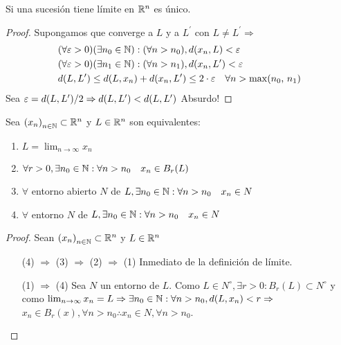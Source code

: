 \begin{lemma}
  Si una sucesión tiene límite en \(\mathbb{R}^n\) es único.
  \begin{proof}
    Supongamos que converge a \(L\) y a \(L^{\prime} \) con \(L \neq L^{\prime} \Rightarrow \) \begin{align*}
       & (\forall \varepsilon > 0)(\exists n_0 \in \mathbb{N}) : (\forall n > n_0), d(x_n, L) < \varepsilon                                      \\
       & (\forall \varepsilon > 0)(\exists n_1 \in \mathbb{N}) : (\forall n > n_1), d(x_n, L^{\prime}) < \varepsilon                             \\
       & d(L, L^{\prime}) \leq d(L, x_n) + d(x_n, L^{\prime}) \leq 2 \cdot \varepsilon \quad \forall n > \max(n_0\text{, } n_1)
    \end{align*}
    Sea \(\varepsilon = d(L, L^{\prime})/2 \Rightarrow d(L, L^{\prime}) < d(L, L^{\prime})\) Absurdo!
  \end{proof}
\end{lemma}

\begin{prop}
  Sea \({(x_n)}_{n \in \mathbb{N}} \subset \mathbb{R}^n\) y \(L \in \mathbb{R}^n\) son equivalentes:

  \begin{enumerate}
    \item \(L = \lim_{n \to \infty} x_n\)
    \item \(\forall r > 0, \exists n_0 \in \mathbb{N} : \forall n > n_0 \quad x_n \in B_r(L)\)
    \item \(\forall \) entorno abierto \(N\) de \(L, \exists n_0 \in \mathbb{N} : \forall n > n_0 \quad x_n \in N\)
    \item \(\forall \) entorno \(N\) de \(L, \exists n_0 \in \mathbb{N} : \forall n > n_0 \quad x_n \in N\)
  \end{enumerate}
  \begin{proof}
    Sean \({(x_n)}_{n \in \mathbb{N}} \subset \mathbb{R}^n\) y \(L \in \mathbb{R}^n\) \begin{enumerate}
      \item[(4) \(\Rightarrow \) (3)] \(\Rightarrow \) (2) \(\Rightarrow \) (1) Inmediato de la definición de límite.
      \item [(1) \(\Rightarrow \) (4)] Sea \(N\) un entorno de \(L\). Como \(L \in N^{\circ}, \exists r > 0 : B_r(L) \subset N^{\circ} \) y como \(\lim_{n \to \infty} x_n = L \Rightarrow \exists n_0 \in \mathbb{N} : \forall n > n_0, d(L, x_n) < r \Rightarrow \) \\
            \(x_n \in B_r(x), \forall n > n_0 \therefore x_n \in N, \forall n > n_0\).
    \end{enumerate}
  \end{proof}
\end{prop}

